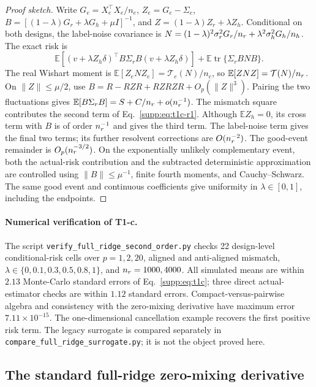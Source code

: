 \begin{proof}[Proof sketch]
Write $G_e=X_e^\top X_e/n_e$, $Z_e=G_e-\Sigma_e$, $B=[(1-\lambda)G_r+\lambda G_h+\mu I]^{-1}$, and $Z=(1-\lambda)Z_r+\lambda Z_h$. Conditional on both designs, the label-noise covariance is
$N=(1-\lambda)^2\sigma_r^2G_r/n_r+\lambda^2\sigma_h^2G_h/n_h$.
The exact risk is
\begin{equation}
 \mathbb E[(v+\lambda Z_h\delta)^\top B\Sigma_rB(v+\lambda Z_h\delta)]
 +\mathbb E\operatorname{tr}\{\Sigma_rBNB\}.
 \label{supp:eq:t1c-exact}
\end{equation}
The real Wishart moment is $\mathbb E[Z_eNZ_e]=\mathcal T_e(N)/n_e$, so $\mathbb E[ZNZ]=\mathcal T(N)/n_r$. On $\|Z\|\le\mu/2$, use $B=R-RZR+RZRZR+O_p(\|Z\|^3)$. Pairing the two fluctuations gives $\mathbb E[B\Sigma_rB]=S+C/n_r+o(n_r^{-1})$.
The mismatch square contributes the second term of Eq.~\eqref{supp:eq:t1c-r1}. Although $\mathbb EZ_h=0$, its cross term with $B$ is of order $n_r^{-1}$ and gives the third term. The label-noise term gives the final two terms; its further resolvent corrections are $O(n_r^{-2})$.
The good-event remainder is $O_p(n_r^{-3/2})$. On the exponentially unlikely complementary event, both the actual-risk contribution and the subtracted deterministic approximation are controlled using $\|B\|\le\mu^{-1}$, finite fourth moments, and Cauchy--Schwarz. The same good event and continuous coefficients give uniformity in $\lambda\in[0,1]$, including the endpoints.
\end{proof}

\paragraph{Numerical verification of T1-c.}
The script \texttt{verify\_full\_ridge\_second\_order.py} checks 22 design-level conditional-risk cells over $p=1,2,20$, aligned and anti-aligned mismatch, $\lambda\in\{0,0.1,0.3,0.5,0.8,1\}$, and $n_r=1000,4000$. All simulated means are within $2.13$ Monte-Carlo standard errors of Eq.~\eqref{supp:eq:t1c}; three direct actual-estimator checks are within $1.12$ standard errors. Compact-versus-pairwise algebra and consistency with the zero-mixing derivative have maximum error $7.11\times10^{-15}$. The one-dimensional cancellation example recovers the first positive risk term. The legacy surrogate is compared separately in \texttt{compare\_full\_ridge\_surrogate.py}; it is not the object proved here.

\subsection{The standard full-ridge zero-mixing derivative}

